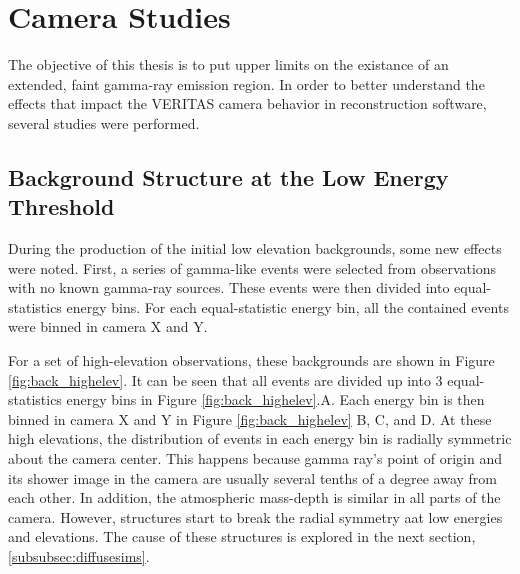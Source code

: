 \section{Camera Studies}
  The objective of this thesis is to put upper limits on the existance of an extended, faint gamma-ray emission region.
  In order to better understand the effects that impact the VERITAS camera behavior in reconstruction software, several studies were performed.

  \subsection{Background Structure at the Low Energy Threshold}
    During the production of the initial low elevation backgrounds, some new effects were noted.
    First, a series of gamma-like events were selected from observations with no known gamma-ray sources.
    These events were then divided into equal-statistics energy bins.
    For each equal-statistic energy bin, all the contained events were binned in camera X and Y.

    For a set of high-elevation observations, these backgrounds are shown in Figure \ref{fig:back_highelev}.
    It can be seen that all events are divided up into 3 equal-statistics energy bins in Figure \ref{fig:back_highelev}.A.
    Each energy bin is then binned in camera X and Y in Figure \ref{fig:back_highelev} B, C, and D.
    At these high elevations, the distribution of events in each energy bin is radially symmetric about the camera center.
    This happens because gamma ray's point of origin and its shower image in the camera are usually several tenths of a degree away from each other.
    In addition, the atmospheric mass-depth is similar in all parts of the camera.
    However, structures start to break the radial symmetry aat low energies and elevations.
    The cause of these structures is explored in the next section, \ref{subsubsec:diffusesims}.

